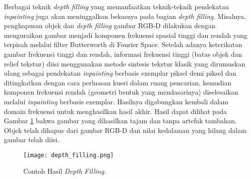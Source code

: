 Berbagai teknik \textit{depth filling} yang memanfaatkan teknik-teknik pendekatan \textit{inpainting} juga akan meninggalkan bekasnya pada bagian \textit{depth filling}. Misalnya, penghapusan objek dan \textit{depth filling} gambar RGB-D dilakukan dengan menguraikan gambar menjadi komponen frekuensi spasial tinggi dan rendah yang terpisah melalui filter Butterworth di Fourier Space.
Setelah adanya keterikatan gambar frekuensi tinggi dan rendah, informasi frekuensi tinggi (batas objek dan relief tekstur) diisi menggunakan metode sintesis tekstur klasik yang dirumuskan ulang sebagai pendekatan \textit{inpainting} berbasis exemplar piksel demi piksel dan ditingkatkan dengan cara perluasan kueri dalam ruang pencarian, kemudian komponen frekuensi rendah (geometri bentuk yang mendasarinya) diselesaikan melalui \textit{inpainting} berbasis exemplar. Hasilnya  digabungkan kembali dalam domain frekuensi untuk menghasilkan hasil akhir. Hasil dapat dilihat pada Gambar \ref*{fig:Ch02_depth_filling} bahwa gambar yang dihasilkan tajam dan tanpa artefak tambahan. Objek telah dihapus dari gambar RGB-D dan nilai kedalaman yang hilang dalam gambar telah diisi.
\begin{figure}[H]
    \centering
    \texttt{[image: depth\_filling.png]}
    \caption{Contoh Hasil \textit{Depth Filling}\cite{b9}.}
    \label{fig:Ch02_depth_filling}
\end{figure}

